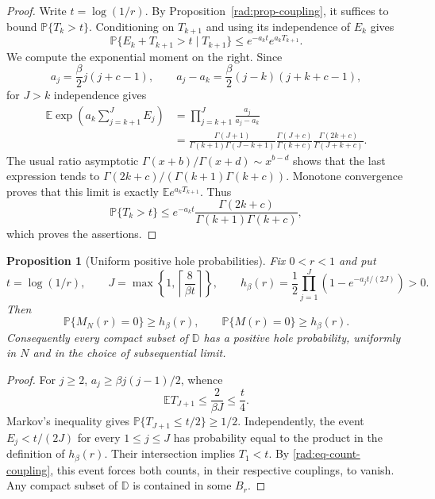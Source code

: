\documentclass[11pt,a4paper]{article}
\numberwithin{equation}{section}
\newtheorem{proposition}[theorem]{Proposition}
\theoremstyle{definition}
\theoremstyle{remark}
\newcommand{\D}{\mathbb D}
\newcommand{\E}{\mathbb E}
\newcommand{\Pbb}{\mathbb P}
\begin{document}
\begin{proof}
Write $t=\log(1/r)$.  By Proposition~\ref{rad:prop-coupling}, it
suffices to bound $\Pbb\{T_k>t\}$.  Conditioning on $T_{k+1}$ and using
its independence of $E_k$ gives
\[
 \Pbb\{E_k+T_{k+1}>t\mid T_{k+1}\}
 \leq e^{-a_kt}e^{a_kT_{k+1}}.
\]
We compute the exponential moment on the right.  Since
\[
 a_j=\frac{\beta}{2}j(j+c-1),\qquad
 a_j-a_k=\frac{\beta}{2}(j-k)(j+k+c-1),
\]
for $J>k$ independence gives
\begin{align*}
 \E\exp\left(a_k\sum_{j=k+1}^J E_j\right)
 &=\prod_{j=k+1}^J\frac{a_j}{a_j-a_k}\\
 &=\frac{\Gamma(J+1)}{\Gamma(k+1)\Gamma(J-k+1)}
   \frac{\Gamma(J+c)}{\Gamma(k+c)}
   \frac{\Gamma(2k+c)}{\Gamma(J+k+c)}.
\end{align*}
The usual ratio asymptotic $\Gamma(x+b)/\Gamma(x+d)\sim x^{b-d}$
shows that the last expression tends to
$\Gamma(2k+c)/(\Gamma(k+1)\Gamma(k+c))$.  Monotone convergence proves
that this limit is exactly $\E e^{a_kT_{k+1}}$.  Thus
\[
 \Pbb\{T_k>t\}\leq
 e^{-a_kt}\frac{\Gamma(2k+c)}{\Gamma(k+1)\Gamma(k+c)},
\]
which proves the assertions.
\end{proof}

\begin{proposition}[Uniform positive hole probabilities]
\label{rad:prop-holes}
Fix $0<r<1$ and put
\[
 t=\log(1/r),\qquad
 J=\max\left\{1,\left\lceil\frac{8}{\beta t}\right\rceil\right\},
 \qquad
 h_\beta(r)=\frac12\prod_{j=1}^J
 \left(1-e^{-a_jt/(2J)}\right)>0.
\]
Then
\begin{equation}
 \Pbb\{M_N(r)=0\}\geq h_\beta(r),\qquad
 \Pbb\{M(r)=0\}\geq h_\beta(r).
 \label{rad:eq-hole-bound}
\end{equation}
Consequently every compact subset of $\D$ has a positive hole
probability, uniformly in $N$ and in the choice of subsequential limit.
\end{proposition}

\begin{proof}
For $j\geq2$, $a_j\geq\beta j(j-1)/2$, whence
\[
 \E T_{J+1}\leq\frac{2}{\beta J}\leq\frac t4.
\]
Markov's inequality gives
$\Pbb\{T_{J+1}\leq t/2\}\geq1/2$.  Independently, the event
$E_j<t/(2J)$ for every $1\leq j\leq J$ has probability equal to the
product in the definition of $h_\beta(r)$.  Their intersection implies
$T_1<t$.  By \eqref{rad:eq-count-coupling}, this event forces both
counts, in their respective couplings, to vanish.  Any compact subset
of $\D$ is contained in some $B_r$.
\end{proof}
\end{document}
